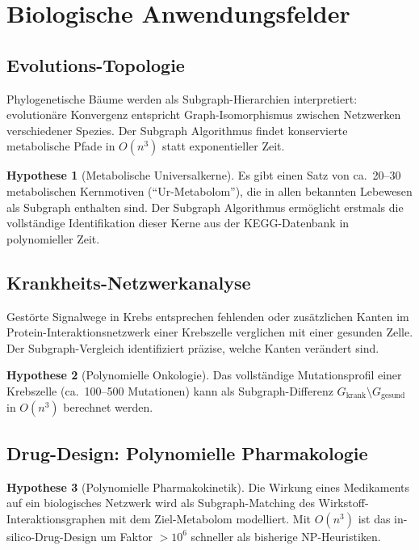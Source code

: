 ﻿\documentclass[a4paper,12pt]{scrreprt}
\theoremstyle{definition}
\newtheorem{hypothese}{Hypothese}[section]
\begin{document}
\section{Biologische Anwendungsfelder}

\subsection{Evolutions-Topologie}

Phylogenetische Bäume werden als Subgraph-Hierarchien interpretiert:
evolutionäre Konvergenz entspricht Graph-Isomorphismus zwischen
Netzwerken verschiedener Spezies. Der Subgraph Algorithmus findet
konservierte metabolische Pfade in $O(n^3)$ statt exponentieller Zeit.

\begin{hypothese}[Metabolische Universalkerne]
  Es gibt einen Satz von ca.\ 20--30 metabolischen Kernmotiven
  (``Ur-Metabolom''), die in allen bekannten Lebewesen als Subgraph
  enthalten sind. Der Subgraph Algorithmus ermöglicht erstmals die
  vollständige Identifikation dieser Kerne aus der KEGG-Datenbank
  in polynomieller Zeit.
\end{hypothese}

\subsection{Krankheits-Netzwerkanalyse}

Gestörte Signalwege in Krebs entsprechen fehlenden oder zusätzlichen
Kanten im Protein-Interaktionsnetzwerk einer Krebszelle verglichen mit
einer gesunden Zelle. Der Subgraph-Vergleich identifiziert präzise,
welche Kanten verändert sind.

\begin{hypothese}[Polynomielle Onkologie]
  Das vollständige Mutationsprofil einer Krebszelle (ca.\ 100--500
  Mutationen) kann als Subgraph-Differenz $G_{\mathrm{krank}} \setminus
  G_{\mathrm{gesund}}$ in $O(n^3)$ berechnet werden.
\end{hypothese}

\subsection{Drug-Design: Polynomielle Pharmakologie}

\begin{hypothese}[Polynomielle Pharmakokinetik]
  Die Wirkung eines Medikaments auf ein biologisches Netzwerk wird
  als Subgraph-Matching des Wirkstoff-Interaktionsgraphen mit dem
  Ziel-Metabolom modelliert. Mit $O(n^3)$ ist das
  in-silico-Drug-Design um Faktor $> 10^6$ schneller als bisherige
  NP-Heuristiken.
\end{hypothese}
\end{document}
